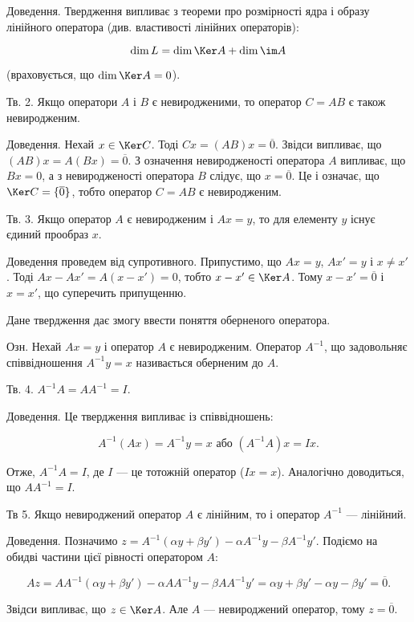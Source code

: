 Доведення. Твердження випливає з теореми про розмірності ядра і образу
лінійного оператора (див. властивості лінійних операторів):

$$\dim L = \dim \Ker A + \dim \im A$$

(враховується, що $\dim \Ker A = 0$).



Тв. 2. Якщо оператори $A$ і $B$ є невиродженими, то оператор $C = A B$ є також
невиродженим.

Доведення. Нехай $x \in \Ker C$. Тоді $C x = (A B)x = \overline{0}$. Звідси випливає, що
$(AB)x = A(Bx) = \overline{0}$. З означення невиродженості оператора $A$ випливає, що
$B x = 0$, а з невиродженості оператора $B$ слідує, що $x = \overline{0}$. Це і означає, що
$\Ker C = \{\overline{0}\}$, тобто оператор $C = A B$ є невиродженим.


Тв. 3. Якщо оператор $A$ є невиродженим і $A x = y$, то для елементу $y$ існує
єдиний прообраз $x$.

Доведення проведем від супротивного. Припустимо, що $A x = y$, $A x' = y$ і
$x \neq x'$. Тоді $Ax - Ax' = A(x - x') = 0$, тобто $x - x' \in \Ker A$. Тому $x - x' = \overline{0}$ і
$x = x'$, що суперечить припущенню.

Дане твердження дає змогу ввести поняття оберненого оператора. 

Озн. Нехай $A x = y$ і оператор $A$ є невиродженим. Оператор $A^{-1}$, що
задовольняє співвідношення $A^{-1} y = x$ називається оберненим до $A$.

Тв. 4. $A^{-1}A = A A^{-1} = I$.

Доведення. Це твердження випливає із співвідношень:

$$A^{-1}(Ax) = A^{-1}y = x \text{ або } (A^{-1}A)x = Ix.$$

Отже, $A^{-1}A = I$, де $I$ --- це тотожній оператор ($Ix = x$). Аналогічно доводиться, що
$AA^{-1} = I$.


Тв 5. Якщо невироджений оператор $A$ є лінійним, то і оператор $A^{-1}$ --- лінійний.


Доведення. Позначимо $z = A^{-1}(\alpha y + \beta y') - \alpha A^{-1} y - \beta A^{-1} y'$. Подіємо на
обидві частини цієї рівності оператором $A$:

$$Az = AA^{-1}(\alpha y + \beta y') - \alpha A A^{-1} y - \beta A A^{-1} y' = \alpha y + \beta y' - \alpha y - \beta y' = \overline{0}.$$

Звідси випливає, що $z \in \Ker A$. Але $A$ --- невироджений оператор, тому $z = \overline{0}$.

